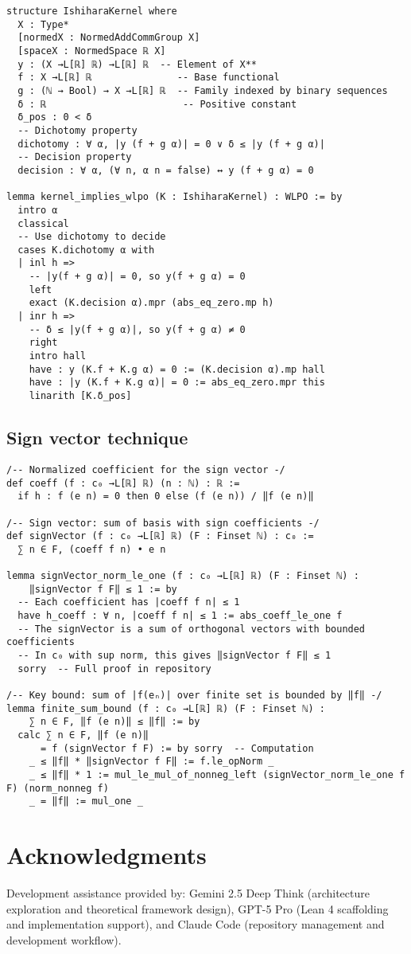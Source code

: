 \documentclass[11pt]{article}  %
\begin{document}
\begin{lstlisting}[caption={Ishihara kernel structure in Lean}]
structure IshiharaKernel where
  X : Type*
  [normedX : NormedAddCommGroup X]
  [spaceX : NormedSpace ℝ X]
  y : (X →L[ℝ] ℝ) →L[ℝ] ℝ  -- Element of X**
  f : X →L[ℝ] ℝ               -- Base functional
  g : (ℕ → Bool) → X →L[ℝ] ℝ  -- Family indexed by binary sequences
  δ : ℝ                        -- Positive constant
  δ_pos : 0 < δ
  -- Dichotomy property
  dichotomy : ∀ α, |y (f + g α)| = 0 ∨ δ ≤ |y (f + g α)|
  -- Decision property  
  decision : ∀ α, (∀ n, α n = false) ↔ y (f + g α) = 0

lemma kernel_implies_wlpo (K : IshiharaKernel) : WLPO := by
  intro α
  classical
  -- Use dichotomy to decide
  cases K.dichotomy α with
  | inl h => 
    -- |y(f + g α)| = 0, so y(f + g α) = 0
    left
    exact (K.decision α).mpr (abs_eq_zero.mp h)
  | inr h =>
    -- δ ≤ |y(f + g α)|, so y(f + g α) ≠ 0
    right
    intro hall
    have : y (K.f + K.g α) = 0 := (K.decision α).mp hall
    have : |y (K.f + K.g α)| = 0 := abs_eq_zero.mpr this
    linarith [K.δ_pos]
\end{lstlisting}

\subsection{Sign vector technique}

\begin{lstlisting}[caption={Sign vector construction for norm bounds}]
/-- Normalized coefficient for the sign vector -/
def coeff (f : c₀ →L[ℝ] ℝ) (n : ℕ) : ℝ :=
  if h : f (e n) = 0 then 0 else (f (e n)) / ‖f (e n)‖

/-- Sign vector: sum of basis with sign coefficients -/
def signVector (f : c₀ →L[ℝ] ℝ) (F : Finset ℕ) : c₀ :=
  ∑ n ∈ F, (coeff f n) • e n

lemma signVector_norm_le_one (f : c₀ →L[ℝ] ℝ) (F : Finset ℕ) :
    ‖signVector f F‖ ≤ 1 := by
  -- Each coefficient has |coeff f n| ≤ 1
  have h_coeff : ∀ n, |coeff f n| ≤ 1 := abs_coeff_le_one f
  -- The signVector is a sum of orthogonal vectors with bounded coefficients
  -- In c₀ with sup norm, this gives ‖signVector f F‖ ≤ 1
  sorry  -- Full proof in repository

/-- Key bound: sum of |f(eₙ)| over finite set is bounded by ‖f‖ -/
lemma finite_sum_bound (f : c₀ →L[ℝ] ℝ) (F : Finset ℕ) :
    ∑ n ∈ F, ‖f (e n)‖ ≤ ‖f‖ := by
  calc ∑ n ∈ F, ‖f (e n)‖ 
      = f (signVector f F) := by sorry  -- Computation
    _ ≤ ‖f‖ * ‖signVector f F‖ := f.le_opNorm _
    _ ≤ ‖f‖ * 1 := mul_le_mul_of_nonneg_left (signVector_norm_le_one f F) (norm_nonneg f)
    _ = ‖f‖ := mul_one _
\end{lstlisting}

\section*{Acknowledgments}
Development assistance provided by: Gemini 2.5 Deep Think (architecture exploration and theoretical framework design), GPT-5 Pro (Lean 4 scaffolding and implementation support), and Claude Code (repository management and development workflow).
\end{document}
